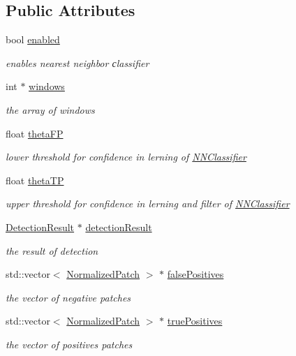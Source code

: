\subsection*{Public Attributes}
\begin{DoxyCompactItemize}
\item 
bool \hyperlink{classtld_1_1NNClassifier_a7a86c7c4d1bf5664540f476f455dad21}{enabled}
\begin{DoxyCompactList}\small\item\em enables nearest neighbor сlassifier \end{DoxyCompactList}\item 
int $\ast$ \hyperlink{classtld_1_1NNClassifier_a6a4aab5ed014405c9dbd9162af1b1d7c}{windows}
\begin{DoxyCompactList}\small\item\em the array of windows \end{DoxyCompactList}\item 
float \hyperlink{classtld_1_1NNClassifier_a5cddbd7f4a38e95a7f00cb1013962b9e}{theta\-F\-P}
\begin{DoxyCompactList}\small\item\em lower threshold for confidence in lerning of \hyperlink{classtld_1_1NNClassifier}{N\-N\-Classifier} \end{DoxyCompactList}\item 
float \hyperlink{classtld_1_1NNClassifier_aada6ca01c7b5224439e375444947cd16}{theta\-T\-P}
\begin{DoxyCompactList}\small\item\em upper threshold for confidence in lerning and filter of \hyperlink{classtld_1_1NNClassifier}{N\-N\-Classifier} \end{DoxyCompactList}\item 
\hyperlink{classtld_1_1DetectionResult}{Detection\-Result} $\ast$ \hyperlink{classtld_1_1NNClassifier_a5320e517bb5ad4ed524701df5cc200aa}{detection\-Result}
\begin{DoxyCompactList}\small\item\em the result of detection \end{DoxyCompactList}\item 
std\-::vector$<$ \hyperlink{classtld_1_1NormalizedPatch}{Normalized\-Patch} $>$ $\ast$ \hyperlink{classtld_1_1NNClassifier_abc088471e8f9e259cc07cbb9a704fb28}{false\-Positives}
\begin{DoxyCompactList}\small\item\em the vector of negative patches \end{DoxyCompactList}\item 
std\-::vector$<$ \hyperlink{classtld_1_1NormalizedPatch}{Normalized\-Patch} $>$ $\ast$ \hyperlink{classtld_1_1NNClassifier_ac17849309a8aed1fdc3e3247f22b5fa2}{true\-Positives}
\begin{DoxyCompactList}\small\item\em the vector of positives patches \end{DoxyCompactList}\end{DoxyCompactItemize}
